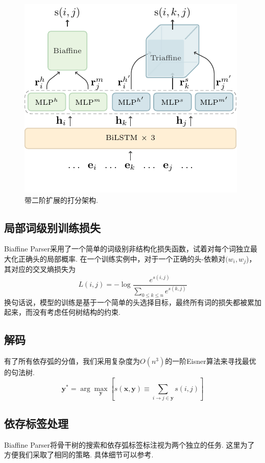 \begin{figure}[tb]
    \centering
    \includegraphics[scale=1.5]{figures/framework.pdf}
    \caption{带二阶扩展的打分架构.}
    \label{fig:dep-framework}
\end{figure}

\subsection{局部词级别训练损失}
Biaffine Parser采用了一个简单的词级别非结构化损失函数，试着对每个词独立最大化正确头的局部概率.
在一个训练实例中，对于一个正确的头-依赖对$(w_i, w_j$)，其对应的交叉熵损失为
\begin{equation} \label{eq:biaffine-loss}
    \mathit{L}(i,j) = -\log{\frac{e^{s(i,j)}}{\sum_{0 \le k \le n} e^{s(k,j)}}}
\end{equation}
换句话说，模型的训练是基于一个简单的头选择目标，最终所有词的损失都被累加起来，而没有考虑任何树结构的约束.

\subsection{解码}
有了所有依存弧的分值，我们采用复杂度为$O(n^3)$的一阶Eisner算法来寻找最优的句法树.
\begin{equation}
    \label{eq:map-decoding}
    {\boldsymbol{y}}^* = \arg\max_{\boldsymbol{y}} \left[ s(\boldsymbol{x},\boldsymbol{y}) \equiv
        \sum_{i \rightarrow j \in \boldsymbol{y}}{s(i,j)} \right]
\end{equation}

\subsection{依存标签处理}
Biaffine Parser将骨干树的搜索和依存弧标签标注视为两个独立的任务.
这里为了方便我们采取了相同的策略. 具体细节可以参考\cite{Timothy-d17-biaffine}.

